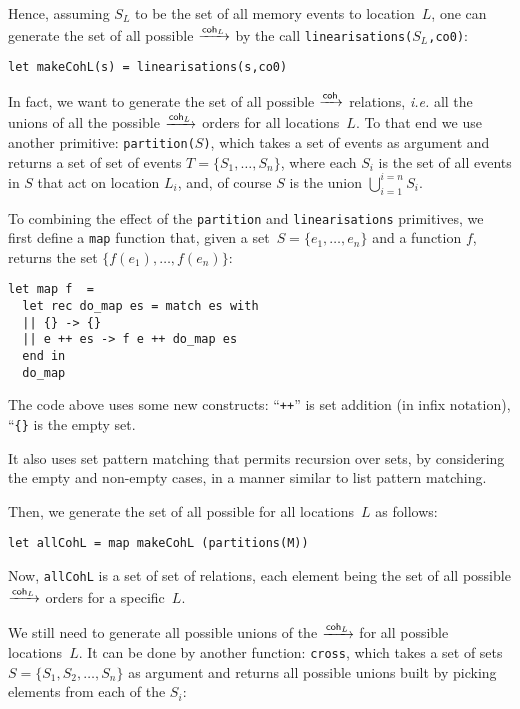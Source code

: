 \documentclass[a4paper]{article}
\begin{document}
Hence, assuming $S_L$ to be the set of all memory events to location~$L$,
one can generate the set of all possible $\xrightarrow{\textsf{\scriptsize{}coh$_{L}$}}$ by the call
\texttt{linearisations($S_L$,co0)}:
\begin{verbatim}
let makeCohL(s) = linearisations(s,co0)
\end{verbatim}

In fact, we want to generate the set of all possible $\xrightarrow{\textsf{\scriptsize{}coh}}$ relations,
\emph{i.e.} all the unions of all the possible $\xrightarrow{\textsf{\scriptsize{}coh$_{L}$}}$ orders for all
locations~$L$. To that end we use another \cat{} primitive:
\texttt{partition($S$)}, which takes a set of events as argument and
returns a set of set of events $T = \{S_1,\ldots,S_n\}$, where each
$S_i$ is the set of all events in $S$ that act on location $L_i$,
and, of course $S$ is the union $\bigcup_{i=1}^{i=n} S_i$.

To combining the effect of the \texttt{partition} and \texttt{linearisations}
primitives, we first define a \texttt{map} function that, given a set~$S=
\{e_1,\ldots,e_n\}$ and a function $f$, returns the set
$\{f(e_1),\ldots,f(e_n)\}$:
\begin{verbatim}
let map f  =
  let rec do_map es = match es with
  || {} -> {}
  || e ++ es -> f e ++ do_map es
  end in
  do_map
\end{verbatim}

The code above uses some new \cat{} constructs: ``\texttt{++}'' is set addition
(in infix notation), ``\verb+{}+ is the empty set.

It also uses set pattern matching that permits recursion over sets,
by considering the empty and non-empty cases, in a manner similar
to list pattern matching.

Then, we generate the set of all possible  for all locations~$L$ as
follows:
\begin{verbatim}
let allCohL = map makeCohL (partitions(M))
\end{verbatim}

Now, \texttt{allCohL} is a set of set of relations, each element being the
set of all possible $\xrightarrow{\textsf{\scriptsize{}coh$_{L}$}}$ orders for a specific~$L$.  

We still need to generate all possible unions of the $\xrightarrow{\textsf{\scriptsize{}coh$_{L}$}}$ for
all possible locations~$L$.  It can be done by another \cat{} function:
\texttt{cross}, which takes a set of sets $S = \{S_1, S_2, \ldots, S_n\}$ as
argument and returns all possible unions built by picking elements from each of
the $S_i$: 
\end{document}
